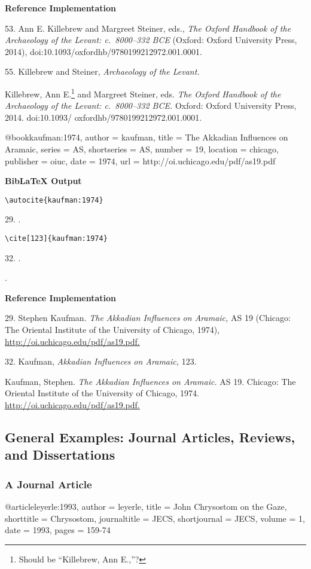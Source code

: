 \documentclass[a4paper]{article}
\newcommand\citetestnpf[4]{%
  {\textbf{BibLaTeX Output}\par
   \nobreak
   \texttt{\textbackslash autocite\{#4\}}\par
   \color{biblatex-colour}
   #1. \cite{#4}.\par
   \color{black}
   \texttt{\textbackslash cite[#3]\{#4\}}\par
   \color{biblatex-colour}
   #2. \cite[#3]{#4}.\par
   \hangindent\bibindent\bibentrycite{#4}.\par}}
\newenvironment{refimp}{%
  \begin{minipage}{\linewidth}
    \setlength{\parskip}{1ex}
    \textbf{Reference Implementation}\par
    \nobreak
    \color{reference-colour}
}{\end{minipage}}
\newenvironment{vb}{%
  \setlength{\parskip}{0pt}
  \verbatim}{\endverbatim}
\begin{document}
\begin{refimp}
  53. Ann E. Killebrew and Margreet Steiner, eds., \emph{The Oxford Handbook
  of the Archaeology of the Levant: c.~8000–332 BCE} (Oxford: Oxford
  University Press, 2014), doi:10.1093/oxfordhb/9780199212972.001.0001.

  55. Killebrew and Steiner, \emph{Archaeology of the Levant.}

  \hangindent\bibindent Killebrew, Ann E.\footnote{Should be “Killebrew, Ann
  E.,”?} and Margreet Steiner, eds. \emph{The Oxford Handbook of the
  Archaeology of the Levant: c.~8000–332 BCE.} Oxford: Oxford University
  Press, 2014. doi:10.1093/ oxfordhb/9780199212972.001.0001.
\end{refimp}

\begin{vb}
@book{kaufman:1974,
  author = kaufman,
  title = {The Akkadian Influences on Aramaic},
  series = AS,
  shortseries = {AS},
  number = {19},
  location = chicago,
  publisher = oiuc,
  date = {1974},
  url = {http://oi.uchicago.edu/pdf/as19.pdf}
}
\end{vb}

\citetestnpf{29}{32}{123}{kaufman:1974}

\begin{refimp}
  29. Stephen Kaufman. \emph{The Akkadian Influences on Aramaic,} AS 19
  (Chicago: The Oriental Institute of the University of Chicago, 1974),
  \url{http://oi.uchicago.edu/pdf/as19.pdf.}

  32. Kaufman, \emph{Akkadian Influences on Aramaic,} 123.

  \hangindent\bibindent Kaufman, Stephen. \emph{The Akkadian Influences on
  Aramaic.} AS 19. Chicago: The Oriental Institute of the University of
  Chicago, 1974. \url{http://oi.uchicago.edu/pdf/as19.pdf.}
\end{refimp}

\subsection{General Examples: Journal Articles, Reviews, and Dissertations}

\subsubsection{A Journal Article}

\begin{vb}
@article{leyerle:1993,
  author = leyerle,
  title = {John Chrysostom on the Gaze},
  shorttitle = {Chrysostom},
  journaltitle = JECS,
  shortjournal = {JECS},
  volume = {1},
  date = {1993},
  pages = {159-74}
}
\end{vb}  
\end{document}
